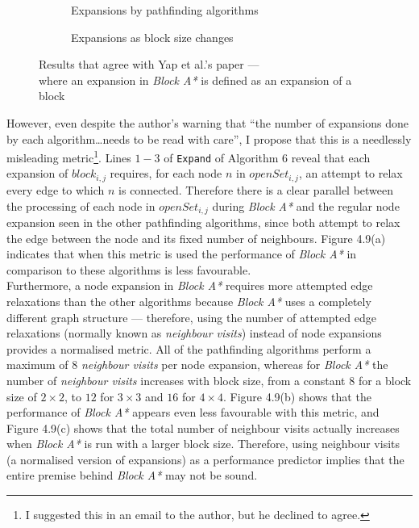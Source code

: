 \documentclass[12pt,notitlepage]{report}
\begin{document}
\begin{figure}
\centering
  \begin{subfigure}{0.49\textwidth}
  \centering
  
  \caption{Expansions by pathfinding algorithms}
  \end{subfigure}
  \begin{subfigure}{0.49\textwidth}
  \centering
  
  \caption{Expansions as block size changes}
  \end{subfigure}
\caption[Results that agree with Yap et al.'s paper]{Results that agree with Yap et al.'s paper --- \\where an expansion in {\em Block A*} is defined as an expansion of a block}
\end{figure}

\noindent
However, even despite the author's warning that ``the number of expansions done by each algorithm\ldots needs to be read with care'', I propose that this is a needlessly misleading metric\footnote{I suggested this in an email to the author, but he declined to agree.}. Lines $1-3$ of {\tt Expand} of Algorithm 6 reveal that each expansion of $block_{i,j}$ requires, for each node $n$ in $openSet_{i,j}$, an attempt to relax every edge to which $n$ is connected. Therefore there is a clear parallel between the processing of each node in $openSet_{i,j}$ during {\em Block A*} and the regular node expansion seen in the other pathfinding algorithms, since both attempt to relax the edge between the node and its fixed number of neighbours. Figure 4.9(a) indicates that when this metric is used the performance of {\em Block A*} in comparison to these algorithms is less favourable.\\

\noindent
Furthermore, a node expansion in {\em Block A*} requires more attempted edge relaxations than the other algorithms because {\em Block A*} uses a completely different graph structure --- therefore, using the number of attempted edge relaxations (normally known as {\em neighbour visits}) instead of node expansions provides a normalised metric. All of the pathfinding algorithms perform a maximum of $8$ {\em neighbour visits} per node expansion, whereas for {\em Block A*} the number of {\em neighbour visits} increases with block size, from a constant $8$ for a block size of $2 \times 2$, to $12$ for $3\times 3$ and $16$ for $4 \times 4$. Figure 4.9(b) shows that the performance of {\em Block A*} appears even less favourable with this metric, and Figure 4.9(c) shows that the total number of neighbour visits actually increases when {\em Block A*} is run with a larger block size. Therefore, using neighbour visits (a normalised version of expansions) as a performance predictor implies that the entire premise behind {\em Block A*} may not be sound.\\
\end{document}
